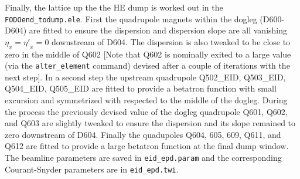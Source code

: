 \documentclass[notitlepage,twocolumn,nofootinbib,showpacs,preprintnumbers,superscriptaddress,amsmath,amssymb]{revtex4-1}
\begin{document}
Finally, the lattice up the the HE dump is worked out in the {\tt FODOend\_todump.ele}. First the quadrupole magnets within the dogleg (D600-D604) are fitted to ensure the dispersion and dispersion slope are all vanishing $\eta_x={\eta'}_x=0$ downstream of D604. The dispersion is also tweaked to be close to zero in the middle of Q602 [Note that Q602 is nominally exited to a large value (via the {\tt alter\_element} command) devised after a couple of iterations with the next step].  In a second step the upstream quadrupole Q502\_EID, Q503\_EID, Q504\_EID, Q505\_EID are fitted to provide a betatron function with small excursion and symmetrized with respected to the middle of the dogleg. During the process the previously devised value of the dogleg quadrupole Q601, Q602, and Q603 are slightly tweaked to ensure the dispersion and its slope remained to zero downstream of D604. Finally the quadupoles Q604, 605, 609, Q611, and Q612 are fitted to provide a large betatron function at the final dump window.  The beamline parameters are saved in {\tt eid\_epd.param} and the corresponding Courant-Snyder parameters are in {\tt eid\_epd.twi}. 
\end{document}

